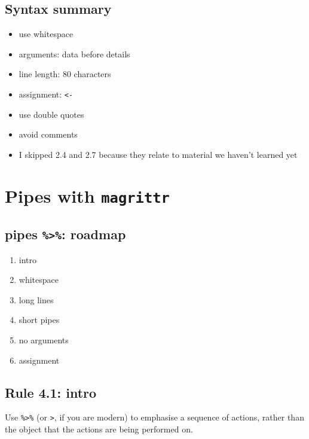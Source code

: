 \documentclass[
  letterpaper,
  DIV=11,
  numbers=noendperiod]{scrreprt}
\providecommand{\tightlist}{%
  \setlength{\itemsep}{0pt}\setlength{\parskip}{0pt}}\usepackage{longtable,booktabs,array}
\begin{document}
\hypertarget{syntax-summary}{%
\subsection{Syntax summary}\label{syntax-summary}}

\begin{itemize}
\tightlist
\item
  use whitespace
\item
  arguments: data before details
\item
  line length: 80 characters
\item
  assignment: \texttt{\textless{}-}
\item
  use double quotes
\item
  avoid comments
\item
  I skipped 2.4 and 2.7 because they relate to material we haven't
  learned yet
\end{itemize}

\hypertarget{pipes-with-magrittr}{%
\section{\texorpdfstring{Pipes with
\texttt{magrittr}}{Pipes with magrittr}}\label{pipes-with-magrittr}}

\hypertarget{pipes-roadmap}{%
\subsection{\texorpdfstring{pipes \texttt{\%\textgreater{}\%}:
roadmap}{pipes \%\textgreater\%: roadmap}}\label{pipes-roadmap}}

\begin{enumerate}
\def\labelenumi{\arabic{enumi}.}
\tightlist
\item
  intro
\item
  whitespace
\item
  long lines
\item
  short pipes
\item
  no arguments
\item
  assignment
\end{enumerate}

\hypertarget{rule-4.1-intro}{%
\subsection{Rule 4.1: intro}\label{rule-4.1-intro}}

Use \texttt{\%\textgreater{}\%} (or \texttt{\textbar{}\textgreater{}},
if you are modern) to emphasise a sequence of actions, rather than the
object that the actions are being performed on.
\end{document}
